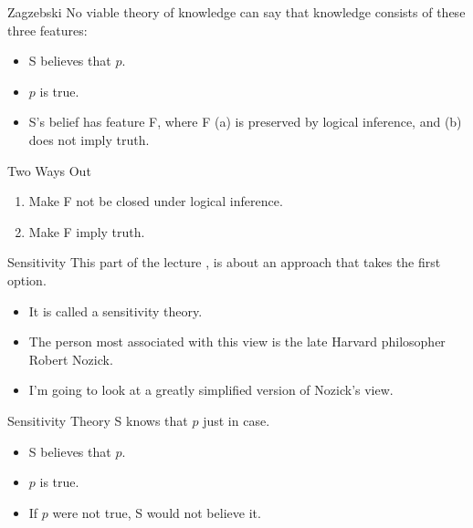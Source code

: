 \documentclass[
  17pt,
  letterpaper,
  ignorenonframetext,
  aspectratio=169,
]{beamer}
\providecommand{\tightlist}{%
  \setlength{\itemsep}{0pt}\setlength{\parskip}{0pt}}\usepackage{longtable,booktabs,array}
\begin{document}
\begin{frame}{Zagzebski}
\protect\hypertarget{zagzebski}{}
No viable theory of knowledge can say that knowledge consists of these
three features:

\begin{itemize}[<+->]
\tightlist
\item
  S believes that \(p\).
\item
  \(p\) is true.
\item
  S's belief has feature F, where F (a) is preserved by logical
  inference, and (b) does not imply truth.
\end{itemize}
\end{frame}

\begin{frame}{Two Ways Out}
\protect\hypertarget{two-ways-out}{}
\begin{enumerate}[<+->]
\tightlist
\item
  Make F not be closed under logical inference.
\item
  Make F imply truth.
\end{enumerate}
\end{frame}

\begin{frame}{Sensitivity}
\protect\hypertarget{sensitivity-1}{}
This part of the lecture , is about an approach that takes the first
option.

\begin{itemize}[<+->]
\tightlist
\item
  It is called a sensitivity theory.
\item
  The person most associated with this view is the late Harvard
  philosopher Robert Nozick.
\item
  I'm going to look at a greatly simplified version of Nozick's view.
\end{itemize}
\end{frame}

\begin{frame}{Sensitivity Theory}
\protect\hypertarget{sensitivity-theory}{}
S knows that \(p\) just in case.

\begin{itemize}[<+->]
\tightlist
\item
  S believes that \(p\).
\item
  \(p\) is true.
\item
  If \(p\) were not true, S would not believe it.
\end{itemize}
\end{frame}
\end{document}
